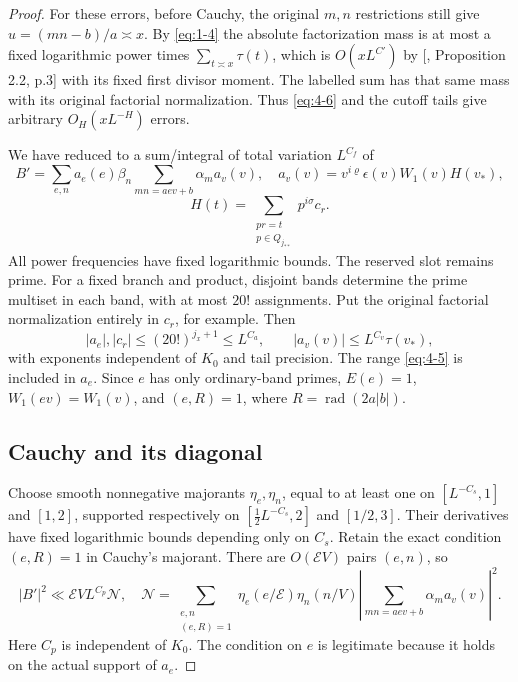 \documentclass[11pt]{article}
\theoremstyle{definition}
\theoremstyle{definition}
\begin{document}
\begin{proof}
For these errors, before Cauchy, the original \(m,n\) restrictions still give \(u=(mn-b)/a\asymp x\). By \eqref{eq:1-4} the absolute factorization mass is at most a fixed logarithmic power times \(\sum_{t\asymp x}\tau(t)\), which is \(O(xL^{C'})\) by [, Proposition 2.2, p.3] with its fixed first divisor moment. The labelled sum has that same mass with its original factorial normalization. Thus \eqref{eq:4-6} and the cutoff tails give arbitrary \(O_H(xL^{-H})\) errors.

We have reduced to a sum/integral of total variation \(L^{C_f}\) of
\begin{equation}
B'=\sum_{e,n}a_e(e)\beta_n\sum_{mn=aev+b}\alpha_ma_v(v),
 \quad a_v(v)=v^{i\varrho}\epsilon(v)W_1(v)H(v_*),        \tag{4.7}\label{eq:4-7}
\end{equation}
\begin{equation}
H(t)=\sum_{\substack{pr=t\\p\in Q_{j_{**}}}}
                    p^{i\sigma}c_r.                    \tag{4.8}\label{eq:4-8}
\end{equation}
All power frequencies have fixed logarithmic bounds. The reserved slot remains prime. For a fixed branch and product, disjoint bands determine the prime multiset in each band, with at most \(20!\) assignments. Put the original factorial normalization entirely in \(c_r\), for example. Then
\begin{equation}
|a_e|,|c_r|\le(20!)^{j_x+1}\le L^{C_a},\qquad
 |a_v(v)|\le L^{C_v}\tau(v_*),                            \tag{4.9}\label{eq:4-9}
\end{equation}
with exponents independent of \(K_0\) and tail precision. The range \eqref{eq:4-5} is included in \(a_e\). Since \(e\) has only ordinary-band primes, \(E(e)=1\), \(W_1(ev)=W_1(v)\), and \((e,R)=1\), where \(R=\operatorname{rad}(2a|b|)\).

\subsection{Cauchy and its diagonal}\label{sec:s4.3}

Choose smooth nonnegative majorants \(\eta_e,\eta_n\), equal to at least one on \([L^{-C_s},1]\) and \([1,2]\), supported respectively on \([\tfrac12L^{-C_s},2]\) and \([1/2,3]\). Their derivatives have fixed logarithmic bounds depending only on \(C_s\). Retain the exact condition \((e,R)=1\) in Cauchy's majorant. There are \(O(\mathcal E V)\) pairs \((e,n)\), so
\begin{equation}
|B'|^2\ll\mathcal E V L^{C_p}\mathcal N,\quad
 \mathcal N=\sum_{\substack{e,n\\(e,R)=1}}
 \eta_e(e/\mathcal E)\eta_n(n/V)
 \left|\sum_{mn=aev+b}\alpha_ma_v(v)\right|^2.            \tag{4.10}\label{eq:4-10}
\end{equation}
Here \(C_p\) is independent of \(K_0\). The condition on \(e\) is legitimate because it holds on the actual support of \(a_e\).


\end{proof}
\end{document}
